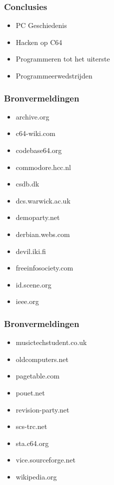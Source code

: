\documentclass[aspectratio=43]{uva-inf-presentation}
\begin{document}

\begin{frame}
\frametitle{Conclusies}

\begin{itemize}
\item PC Geschiedenis
\item Hacken op C64
\item Programmeren tot het uiterste
\item Programmeerwedstrijden
\end{itemize}

\end{frame}


\begin{frame}
\frametitle{Bronvermeldingen}

\begin{multicols}{2}
\begin{itemize}
\item archive.org
\item c64-wiki.com
\item codebase64.org
\item commodore.hcc.nl
\item csdb.dk
\item dcs.warwick.ac.uk
\item demoparty.net
\item derbian.webs.com
\item devil.iki.fi
\item freeinfosociety.com
\item id.scene.org
\item ieee.org
\end{itemize}
\end{multicols}

\end{frame}


\begin{frame}
\frametitle{Bronvermeldingen}

\begin{multicols}{2}
\begin{itemize}
\item musictechstudent.co.uk
\item oldcomputers.net
\item pagetable.com
\item pouet.net
\item revision-party.net
\item scs-trc.net
\item sta.c64.org
\item vice.sourceforge.net
\item wikipedia.org
\end{itemize}
\end{multicols}

\end{frame}
\end{document}

